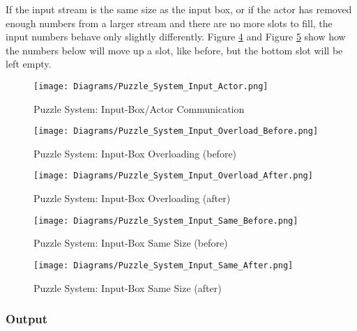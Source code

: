 If the input stream is the same size as the input box, or if the actor has removed
enough numbers from a larger stream and there are no more slots to fill, the input numbers
behave only slightly differently. Figure \ref{fig:Puzzle_System_Input_Same_Before}
and Figure \ref{fig:Puzzle_System_Input_Same_After} show how the numbers below will move up a slot, like before,
but the bottom slot will be left empty.\\

\begin{figure}[!hb]
  \caption{Puzzle System: Input-Box/Actor Communication}
  \label{fig:Puzzle_System_Input_Actor}
  \centering
  \texttt{[image: Diagrams/Puzzle\_System\_Input\_Actor.png]}
\end{figure}

\begin{figure}[!hb]
  \caption{Puzzle System: Input-Box Overloading (before)}
  \label{fig:Puzzle_System_Input_Overload_Before}
  \centering
  \texttt{[image: Diagrams/Puzzle\_System\_Input\_Overload\_Before.png]}
\end{figure}

\begin{figure}[!hb]
  \caption{Puzzle System: Input-Box Overloading (after)}
  \label{fig:Puzzle_System_Input_Overload_After}
  \centering
  \texttt{[image: Diagrams/Puzzle\_System\_Input\_Overload\_After.png]}
\end{figure}
\vfill
\clearpage

\begin{figure}[!hb]
  \caption{Puzzle System: Input-Box Same Size (before)}
  \label{fig:Puzzle_System_Input_Same_Before}
  \centering
  \texttt{[image: Diagrams/Puzzle\_System\_Input\_Same\_Before.png]}
\end{figure}

\begin{figure}[!hb]
  \caption{Puzzle System: Input-Box Same Size (after)}
  \label{fig:Puzzle_System_Input_Same_After}
  \centering
  \texttt{[image: Diagrams/Puzzle\_System\_Input\_Same\_After.png]}
\end{figure}
\vfill
\clearpage

\subsubsection{Output}
